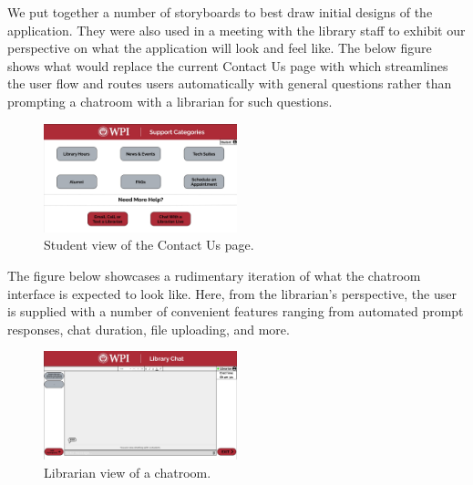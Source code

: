 
We put together a number of storyboards to best draw initial designs of the application. They were also used in a meeting with the library staff to exhibit our perspective on what the application will look and feel like. The below figure shows what would replace the current Contact Us page with which streamlines the user flow and routes users automatically with general questions rather than prompting a chatroom with a librarian for such questions.

\begin{figure}[H]
    \centering
    \includegraphics[width=0.5\textwidth]{chapters/methodology/conceptual_designs/MQP Main Page}
    \caption{Student view of the Contact Us page.}
\end{figure}

The figure below showcases a rudimentary iteration of what the chatroom interface is expected to look like. Here, from the librarian's perspective, the user is supplied with a number of convenient features ranging from automated prompt responses, chat duration, file uploading, and more.

\begin{figure}[H]
    \centering
    \includegraphics[width=0.5\textwidth]{chapters/methodology/conceptual_designs/MQP Librarian Chat.jpg}
    \caption{Librarian view of a chatroom.}
\end{figure}

